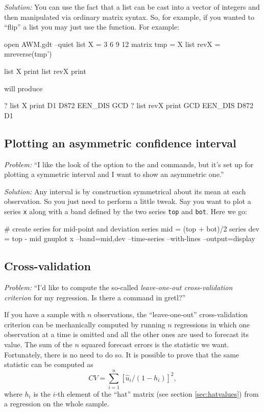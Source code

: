 \emph{Solution:} You can use the fact that a list can be cast into
a vector of integers and then manipulated via ordinary matrix
syntax. So, for example, if you wanted to ``flip'' a list you may
just use the  function. For example:
\begin{code}
open AWM.gdt --quiet
list X = 3 6 9 12
matrix tmp = X
list revX = mreverse(tmp')

list X print
list revX print
\end{code}
will produce
\begin{code}
? list X print
D1 D872 EEN_DIS GCD
? list revX print
GCD EEN_DIS D872 D1
\end{code}

\subsection{Plotting an asymmetric confidence interval}

\emph{Problem:} ``I like the look of the  option to the
 and  commands, but it's set up for plotting a
symmetric interval and I want to show an asymmetric one.''

\emph{Solution:} Any interval is by construction symmetrical about its
mean at each observation. So you just need to perform a little
tweak. Say you want to plot a series \texttt{x} along with a band
defined by the two series \texttt{top} and \texttt{bot}. Here we go:
\begin{code}
# create series for mid-point and deviation
series mid = (top + bot)/2
series dev = top - mid
gnuplot x --band=mid,dev --time-series --with-lines --output=display
\end{code}

\subsection{Cross-validation}
\label{sec:xvalid}

\emph{Problem:} ``I'd like to compute the so-called \emph{leave-one-out
cross-validation criterion} for my regression. Is there a command in
gretl?''

If you have a sample with $n$ observations, the ``leave-one-out''
cross-validation criterion can be mechanically computed by running $n$
regressions in which one observation at a time is omitted and all the
other ones are used to forecast its value. The sum of the $n$ squared
forecast errors is the statistic we want. Fortunately, there is no
need to do so. It is possible to prove that the same statistic can be
computed as
\[
CV = \sum_{i=1}^n [\hat{u}_{i}/(1-h_{i})]^2,
\]
where $h_i$ is the $i$-th element of the ``hat'' matrix (see section
\ref{sec:hatvalues}) from a regression on the whole sample.

